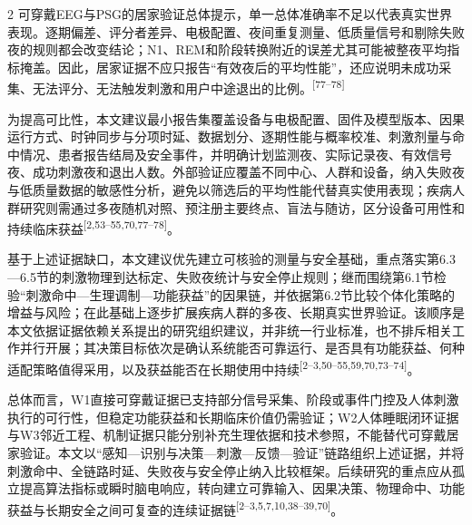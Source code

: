 \documentclass[UTF8,zihao=5,fontset=none]{ctexart}
\newcommand{\hei}{\CJKfamily{hei}}
\newcommand{\leveltwo}[1]{%
  \par\noindent{\hei\fontsize{10.5pt}{12.6pt}\selectfont\mdseries #1\par}}
\newcommand{\refcite}[1]{\nolinebreak[4]\textsuperscript{[#1]}}
\begin{document}
\begin{multicols}{2}
可穿戴EEG与PSG的居家验证总体提示，单一总体准确率不足以代表真实世界表现。逐期偏差、评分者差异、电极配置、夜间重复测量、低质量信号和剔除失败夜的规则都会改变结论；N1、REM和阶段转换附近的误差尤其可能被整夜平均指标掩盖。因此，居家证据不应只报告“有效夜后的平均性能”，还应说明未成功采集、无法评分、无法触发刺激和用户中途退出的比例。\refcite{77--78}\par

为提高可比性，本文建议最小报告集覆盖设备与电极配置、固件及模型版本、因果运行方式、时钟同步与分项时延、数据划分、逐期性能与概率校准、刺激剂量与命中情况、患者报告结局及安全事件，并明确计划监测夜、实际记录夜、有效信号夜、成功刺激夜和退出人数。外部验证应覆盖不同中心、人群和设备，纳入失败夜与低质量数据的敏感性分析，避免以筛选后的平均性能代替真实使用表现；疾病人群研究则需通过多夜随机对照、预注册主要终点、盲法与随访，区分设备可用性和持续临床获益\refcite{2,53--55,70,77--78}。\par

\leveltwo{6.6 研究优先级与总结}

基于上述证据缺口，本文建议优先建立可核验的测量与安全基础，重点落实第6.3—6.5节的刺激物理到达标定、失败夜统计与安全停止规则；继而围绕第6.1节检验“刺激命中—生理调制—功能获益”的因果链，并依据第6.2节比较个体化策略的增益与风险；在此基础上逐步扩展疾病人群的多夜、长期真实世界验证。该顺序是本文依据证据依赖关系提出的研究组织建议，并非统一行业标准，也不排斥相关工作并行开展；其决策目标依次是确认系统能否可靠运行、是否具有功能获益、何种适配策略值得采用，以及获益能否在长期使用中持续\refcite{2--3,50--55,59,70,73--74}。\par

总体而言，W1直接可穿戴证据已支持部分信号采集、阶段或事件门控及人体刺激执行的可行性，但稳定功能获益和长期临床价值仍需验证；W2人体睡眠闭环证据与W3邻近工程、机制证据只能分别补充生理依据和技术参照，不能替代可穿戴居家验证。本文以“感知—识别与决策—刺激—反馈—验证”链路组织上述证据，并将刺激命中、全链路时延、失败夜与安全停止纳入比较框架。后续研究的重点应从孤立提高算法指标或瞬时脑电响应，转向建立可靠输入、因果决策、物理命中、功能获益与长期安全之间可复查的连续证据链\refcite{2--3,5,7,10,38--39,70}。\par



\end{multicols}
\end{document}
